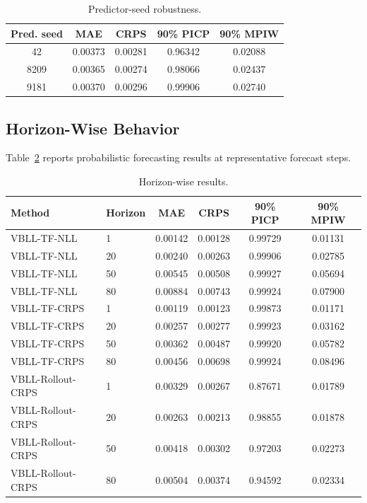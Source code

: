 \documentclass[conference]{IEEEtran}
\begin{document}
\begin{table}[t]
\centering
\scriptsize
\caption{Predictor-seed robustness.}
\label{tab:seed-robustness}
\setlength{\tabcolsep}{2pt}
\begin{tabular}{@{}ccccc@{}}
\toprule
Pred. seed & MAE & CRPS & 90\% PICP & 90\% MPIW \\
\midrule
42 & 0.00373 & 0.00281 & 0.96342 & 0.02088 \\
8209 & 0.00365 & 0.00274 & 0.98066 & 0.02437 \\
9181 & 0.00370 & 0.00296 & 0.99906 & 0.02740 \\
\bottomrule
\end{tabular}
\end{table}

\subsection{Horizon-Wise Behavior}

Table~\ref{tab:horizon} reports probabilistic forecasting results at
representative forecast steps.

\begin{table}[t]
\centering
\scriptsize
\caption{Horizon-wise results.}
\label{tab:horizon}
\setlength{\tabcolsep}{2pt}
\begin{tabular}{@{}llcccc@{}}
\toprule
Method & Horizon & MAE & CRPS & 90\% PICP & 90\% MPIW \\
\midrule
VBLL-TF-NLL & 1 & 0.00142 & 0.00128 & 0.99729 & 0.01131 \\
VBLL-TF-NLL & 20 & 0.00240 & 0.00263 & 0.99906 & 0.02785 \\
VBLL-TF-NLL & 50 & 0.00545 & 0.00508 & 0.99927 & 0.05694 \\
VBLL-TF-NLL & 80 & 0.00884 & 0.00743 & 0.99924 & 0.07900 \\
\midrule
VBLL-TF-CRPS & 1 & 0.00119 & 0.00123 & 0.99873 & 0.01171 \\
VBLL-TF-CRPS & 20 & 0.00257 & 0.00277 & 0.99923 & 0.03162 \\
VBLL-TF-CRPS & 50 & 0.00362 & 0.00487 & 0.99920 & 0.05782 \\
VBLL-TF-CRPS & 80 & 0.00456 & 0.00698 & 0.99924 & 0.08496 \\
\midrule
VBLL-Rollout-CRPS & 1 & 0.00329 & 0.00267 & 0.87671 & 0.01789 \\
VBLL-Rollout-CRPS & 20 & 0.00263 & 0.00213 & 0.98855 & 0.01878 \\
VBLL-Rollout-CRPS & 50 & 0.00418 & 0.00302 & 0.97203 & 0.02273 \\
VBLL-Rollout-CRPS & 80 & 0.00504 & 0.00374 & 0.94592 & 0.02334 \\
\bottomrule
\end{tabular}
\end{table}
\end{document}
